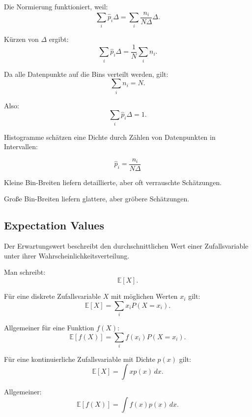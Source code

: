 \documentclass[11pt,a4paper]{scrartcl}
\begin{document}
\begin{calculationbox}
    Die Normierung funktioniert, weil:
    \[
        \sum_i \hat p_i \Delta
        =
        \sum_i \frac{n_i}{N\Delta}\Delta.
    \]

    Kürzen von \(\Delta\) ergibt:
    \[
        \sum_i \hat p_i \Delta
        =
        \frac{1}{N}\sum_i n_i.
    \]

    Da alle Datenpunkte auf die Bins verteilt werden, gilt:
    \[
        \sum_i n_i = N.
    \]

    Also:
    \[
        \sum_i \hat p_i \Delta
        =
        1.
    \]
\end{calculationbox}

\begin{answerbox}
    Histogramme schätzen eine Dichte durch Zählen von Datenpunkten in Intervallen:

    \[
        \boxed{
            \hat p_i
            =
            \frac{n_i}{N\Delta}
        }
    \]

    Kleine Bin-Breiten liefern detaillierte, aber oft verrauschte Schätzungen.

    Große Bin-Breiten liefern glattere, aber gröbere Schätzungen.
\end{answerbox}

\subsection{Expectation Values}

\begin{notebox}
    Der Erwartungswert beschreibt den durchschnittlichen Wert einer Zufallsvariable
    unter ihrer Wahrscheinlichkeitsverteilung.

    Man schreibt:
    \[
        \mathbb{E}[X].
    \]
\end{notebox}

\begin{calculationbox}
    Für eine diskrete Zufallsvariable \(X\) mit möglichen Werten \(x_i\) gilt:
    \[
        \mathbb{E}[X]
        =
        \sum_i x_i P(X=x_i).
    \]

    Allgemeiner für eine Funktion \(f(X)\):
    \[
        \mathbb{E}[f(X)]
        =
        \sum_i f(x_i)P(X=x_i).
    \]
\end{calculationbox}

\begin{calculationbox}
    Für eine kontinuierliche Zufallsvariable mit Dichte \(p(x)\) gilt:
    \[
        \mathbb{E}[X]
        =
        \int x p(x)\,dx.
    \]

    Allgemeiner:
    \[
        \mathbb{E}[f(X)]
        =
        \int f(x)p(x)\,dx.
    \]
\end{calculationbox}
\end{document}
